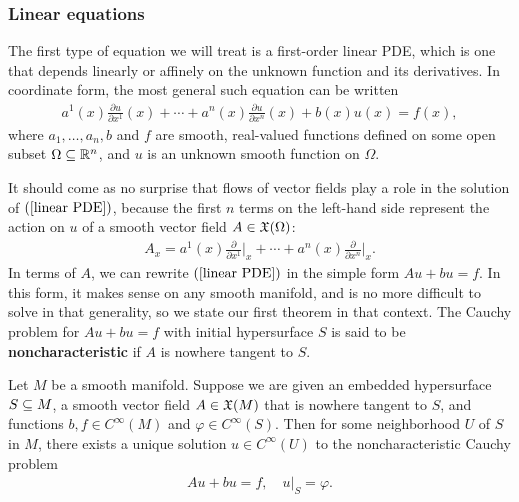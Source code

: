 \subsubsection{Linear equations}
The first type of equation we will treat is a first-order linear PDE, which is one that depends linearly or affinely on the unknown function and its derivatives. In coordinate form, the most general such equation can be written
\begin{align}\label{linear PDE}
a^1(x)\frac{\partial u}{\partial x^1}(x)+\cdots+a^n(x)\frac{\partial u}{\partial x^n}(x)+b(x)u(x)=f(x),
\end{align}
where $a_1,\dots,a_n,b$ and $f$ are smooth, real-valued functions defined on some open subset $\Omega\subseteq\mathbb{R}^n$, and $u$ is an unknown smooth function on $\Omega$.\par
It should come as no surprise that flows of vector fields play a role in the solution of $(\ref{linear PDE})$, because the first $n$ terms on the left-hand side represent the action on $u$ of a smooth vector field $A\in\mathfrak{X}(\Omega)$:
\begin{align}\label{linear PDE vector field}
A_x=a^1(x)\frac{\partial}{\partial x^1}\Big|_x+\cdots+a^n(x)\frac{\partial}{\partial x^n}\Big|_x.
\end{align}
In terms of $A$, we can rewrite $(\ref{linear PDE})$ in the simple form $Au+bu=f$. In this form, it makes sense on any smooth manifold, and is no more difficult to solve in that generality, so we state our first theorem in that context. The Cauchy problem for $Au+bu=f$ with initial hypersurface $S$ is said to be \textbf{noncharacteristic} if $A$ is nowhere tangent to $S$.
\begin{theorem}\label{linear PDE solution}
Let $M$ be a smooth manifold. Suppose we are given an embedded hypersurface $S\subseteq M$, a smooth vector field $A\in\mathfrak{X}(M)$ that is nowhere tangent to $S$, and functions $b,f\in C^\infty(M)$ and $\varphi\in C^\infty(S)$. Then for some neighborhood $U$ of $S$ in $M$, there exists a unique solution $u\in C^\infty(U)$ to the noncharacteristic Cauchy problem
\begin{align}\label{linear PDE Cauchy problem}
Au+bu=f,\quad u|_S=\varphi.
\end{align}
\end{theorem}
